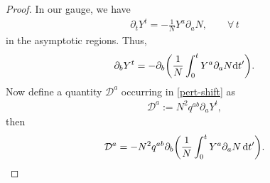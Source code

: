\documentclass[pdftex]{sigma}
\def\ptl{\partial}%
\numberwithin{equation}{section}
\begin{document}
\begin{proof}
In our gauge, we have
\begin{align*}
\ptl_t Y^t = - \frac{1}{N} Y^a\ptl_a N, \qquad \forall\, t
\end{align*}
in the asymptotic regions.
Thus,
\begin{align*}
\ptl_b Y^t = - \ptl_b \biggl(\frac{1}{N} \int^t_{0} Y^a \ptl_a N {\rm d}t' \biggr).
\end{align*}
Now define a quantity $\mathcal{D}^a $ occurring in \eqref{pert-shift} as
\begin{align*}
\mathcal{D}^a := N^2 q^{ab} \ptl_a Y^t,
\end{align*}
then
\begin{align*}
\mathcal{D}^a = - N^2 q^{ab} \ptl_b \biggl(\frac{1}{N} \int^t_{0} Y^a \ptl_a N \,{\rm d}t'\biggr).
\end{align*}


\end{proof}
\end{document}
